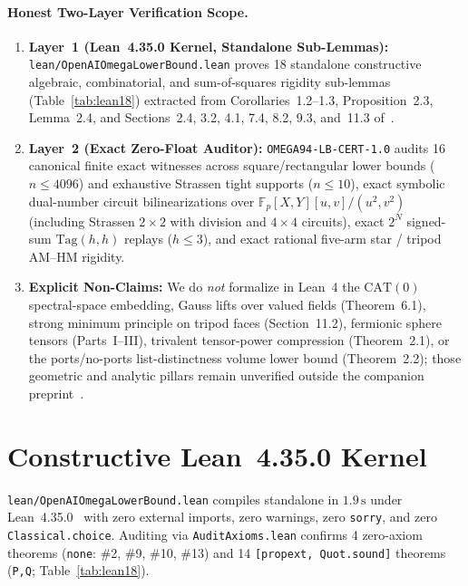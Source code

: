 \documentclass[10pt,twocolumn]{article}
\newcommand{\FF}{\mathbb{F}}
\begin{document}
\paragraph{Honest Two-Layer Verification Scope.}
\begin{enumerate}[leftmargin=1.2em,itemsep=1pt,topsep=2pt]
  \item \textbf{Layer~1 (Lean~4.35.0 Kernel, Standalone Sub-Lemmas):} \texttt{lean/OpenAI\allowbreak OmegaLowerBound.lean} proves 18 standalone constructive algebraic, combinatorial, and sum-of-squares rigidity sub-lemmas (Table~\ref{tab:lean18}) extracted from Corollaries~1.2--1.3, Proposition~2.3, Lemma~2.4, and Sections~2.4, 3.2, 4.1, 7.4, 8.2, 9.3, and~11.3 of~\cite{openai2026omega94}.
  \item \textbf{Layer~2 (Exact Zero-Float Auditor):} \texttt{OMEGA94-\allowbreak LB-\allowbreak CERT-1.0} audits 16 canonical finite exact witnesses across square/rectangular lower bounds ($n\le 4096$) and exhaustive Strassen tight supports ($n\le 10$), exact symbolic dual-number circuit bilinearizations over $\FF_p[X,Y][u,v]/(u^2,v^2)$ (including Strassen $2{\times}2$ with division and $4{\times}4$ circuits), exact $2^N$ signed-sum $\mathrm{Tag}(h,h)$ replays ($h\le 3$), and exact rational five-arm star / tripod AM--HM rigidity.
  \item \textbf{Explicit Non-Claims:} We do \emph{not} formalize in Lean~4 the $\mathrm{CAT}(0)$ spectral-space embedding, Gauss lifts over valued fields (Theorem~6.1), strong minimum principle on tripod faces (Section~11.2), fermionic sphere tensors (Parts~I--III), trivalent tensor-power compression (Theorem~2.1), or the ports/no-ports list-distinctness volume lower bound (Theorem~2.2); those geometric and analytic pillars remain unverified outside the companion preprint~\cite{openai2026omega94}.
\end{enumerate}

\section{Constructive Lean~4.35.0 Kernel}\label{sec:lean}
\texttt{lean/OpenAI\allowbreak OmegaLowerBound.lean} compiles standalone in $1.9\,\mathrm{s}$ under Lean~4.35.0~\cite{demoura2021lean4} with zero external imports, zero warnings, zero \texttt{sorry}, and zero \texttt{Classical.choice}. Auditing via \texttt{AuditAxioms.lean} confirms 4 zero-axiom theorems (\texttt{none}: \#2, \#9, \#10, \#13) and 14 \texttt{[propext, Quot.sound]} theorems (\texttt{P,Q}; Table~\ref{tab:lean18}).
\end{document}
